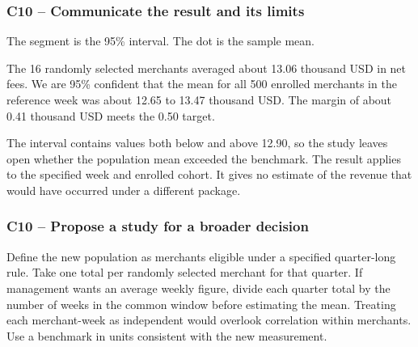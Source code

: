 	\label{sol:c10-3-a}
	\subsubsection*{C10 -- Communicate the result and its limits}

	\noindent
	\begin{minipage}[t]{0.44\textwidth}
	\vspace{0pt}
	\centering

	The segment is the 95\% interval. The dot is the sample mean.
	\end{minipage}
	\hfill
	\begin{minipage}[t]{0.52\textwidth}
	\vspace{0pt}
	The 16 randomly selected merchants averaged about 13.06 thousand USD in net fees. We are 95\% confident that the mean for all 500 enrolled merchants in the reference week was about 12.65 to 13.47 thousand USD. The margin of about 0.41 thousand USD meets the 0.50 target.

	The interval contains values both below and above 12.90, so the study leaves open whether the population mean exceeded the benchmark. The result applies to the specified week and enrolled cohort. It gives no estimate of the revenue that would have occurred under a different package.
	\end{minipage}


	\label{sol:c10-3-b}
	\subsubsection*{C10 -- Propose a study for a broader decision}

	Define the new population as merchants eligible under a specified quarter-long rule. Take one total per randomly selected merchant for that quarter. If management wants an average weekly figure, divide each quarter total by the number of weeks in the common window before estimating the mean. Treating each merchant-week as independent would overlook correlation within merchants. Use a benchmark in units consistent with the new measurement.




